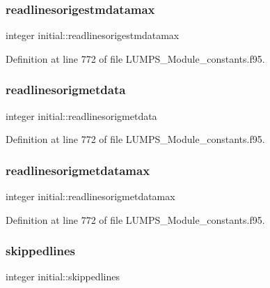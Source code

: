 \subsubsection{\texorpdfstring{readlinesorigestmdatamax}{readlinesorigestmdatamax}}
{\footnotesize\ttfamily integer initial\+::readlinesorigestmdatamax}



Definition at line 772 of file L\+U\+M\+P\+S\+\_\+\+Module\+\_\+constants.\+f95.

\mbox{\label{namespaceinitial_ace32d965c8c765abd9b056bff91a8f87}} 
\subsubsection{\texorpdfstring{readlinesorigmetdata}{readlinesorigmetdata}}
{\footnotesize\ttfamily integer initial\+::readlinesorigmetdata}



Definition at line 772 of file L\+U\+M\+P\+S\+\_\+\+Module\+\_\+constants.\+f95.

\mbox{\label{namespaceinitial_ad101a761c07af352d00a800877772fd7}} 
\subsubsection{\texorpdfstring{readlinesorigmetdatamax}{readlinesorigmetdatamax}}
{\footnotesize\ttfamily integer initial\+::readlinesorigmetdatamax}



Definition at line 772 of file L\+U\+M\+P\+S\+\_\+\+Module\+\_\+constants.\+f95.

\mbox{\label{namespaceinitial_ac8bbf58d250949afdd410ea446af2672}} 
\subsubsection{\texorpdfstring{skippedlines}{skippedlines}}
{\footnotesize\ttfamily integer initial\+::skippedlines}



